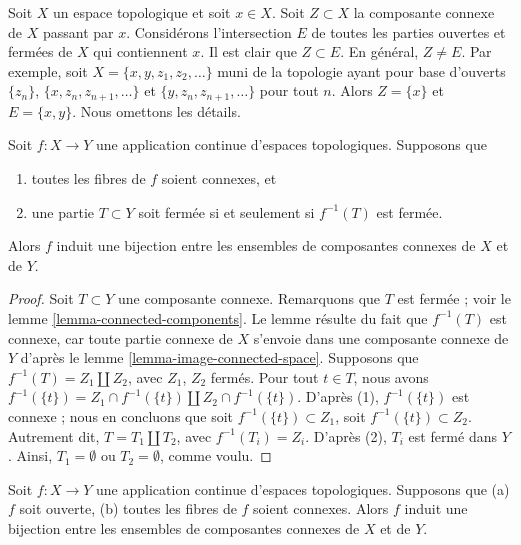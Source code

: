 \begin{remark}
\label{remark-quasi-components}
\begin{reference}
\cite[exemple 6.1.24]{Engelking}
\end{reference}
Soit $X$ un espace topologique et soit $x \in X$. Soit $Z \subset X$ la
composante connexe de $X$ passant par $x$. Considérons l'intersection $E$ de
toutes les parties ouvertes et fermées de $X$ qui contiennent $x$. Il est clair
que $Z \subset E$. En général, $Z \not = E$. Par exemple, soit
$X = \{x, y, z_1, z_2, \ldots\}$ muni de la topologie ayant pour base
d'ouverts $\{z_n\}$, $\{x, z_n, z_{n + 1}, \ldots\}$ et
$\{y, z_n, z_{n + 1}, \ldots\}$ pour tout $n$. Alors $Z = \{x\}$ et
$E = \{x, y\}$. Nous omettons les détails.
\end{remark}

\begin{lemma}
\label{lemma-connected-fibres-quotient-topology-connected-components}
Soit $f : X \to Y$ une application continue d'espaces topologiques.
Supposons que
\begin{enumerate}
\item toutes les fibres de $f$ soient connexes, et
\item une partie $T \subset Y$ soit fermée si et seulement si $f^{-1}(T)$
est fermée.
\end{enumerate}
Alors $f$ induit une bijection entre les ensembles de composantes connexes de
$X$ et de $Y$.
\end{lemma}

\begin{proof}
Soit $T \subset Y$ une composante connexe. Remarquons que $T$ est fermée ;
voir le lemme \ref{lemma-connected-components}. Le lemme résulte du fait que
$f^{-1}(T)$ est connexe, car toute partie connexe de $X$ s'envoie dans une
composante connexe de $Y$ d'après le lemme
\ref{lemma-image-connected-space}.
Supposons que $f^{-1}(T) = Z_1 \amalg Z_2$, avec $Z_1$, $Z_2$ fermés.
Pour tout $t \in T$, nous avons
$f^{-1}(\{t\}) = Z_1 \cap f^{-1}(\{t\}) \amalg Z_2 \cap f^{-1}(\{t\})$.
D'après (1), $f^{-1}(\{t\})$ est connexe ; nous en concluons que soit
$f^{-1}(\{t\}) \subset Z_1$, soit $f^{-1}(\{t\}) \subset Z_2$.
Autrement dit, $T = T_1 \amalg T_2$, avec $f^{-1}(T_i) = Z_i$.
D'après (2), $T_i$ est fermé dans $Y$. Ainsi, $T_1 = \emptyset$ ou
$T_2 = \emptyset$, comme voulu.
\end{proof}

\begin{lemma}
\label{lemma-connected-fibres-connected-components}
Soit $f : X \to Y$ une application continue d'espaces topologiques.
Supposons que
(a) $f$ soit ouverte,
(b) toutes les fibres de $f$ soient connexes.
Alors $f$ induit une bijection entre les ensembles de composantes connexes de
$X$ et de $Y$.
\end{lemma}

